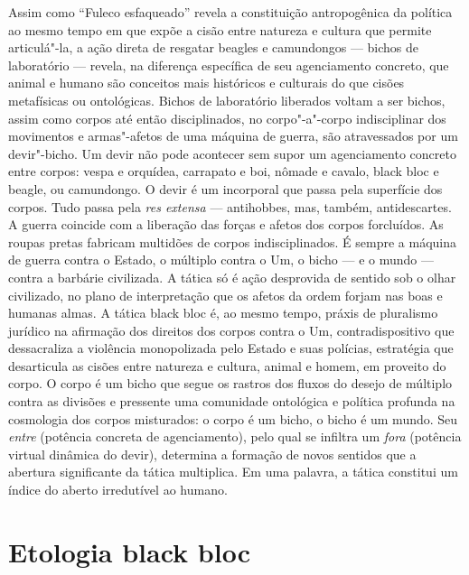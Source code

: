 Assim como ``Fuleco esfaqueado'' revela a constituição antropogênica da
política ao mesmo tempo em que expõe a cisão entre natureza e cultura
que permite articulá"-la, a ação direta de resgatar beagles e
camundongos --- bichos de laboratório --- revela, na diferença específica
de seu agenciamento concreto, que animal e humano são conceitos mais
históricos e culturais do que cisões metafísicas ou ontológicas. Bichos
de laboratório liberados voltam a ser bichos, assim como corpos até
então disciplinados, no corpo"-a"-corpo indisciplinar dos movimentos e
armas"-afetos de uma máquina de guerra, são atravessados por um
devir"-bicho. Um devir não pode acontecer sem supor um agenciamento
concreto entre corpos: vespa e orquídea, carrapato e boi, nômade e
cavalo, black bloc e beagle, ou camundongo. O devir é um
incorporal que passa pela superfície dos corpos. Tudo passa pela
\emph{res extensa} --- antihobbes, mas, também, antidescartes. A guerra
coincide com a liberação das forças e afetos dos corpos forcluídos. As
roupas pretas fabricam multidões de corpos indisciplinados. É sempre a
máquina de guerra contra o Estado, o múltiplo contra o Um, o bicho --- e
o mundo --- contra a barbárie civilizada. A tática só é ação desprovida
de sentido sob o olhar civilizado, no plano de interpretação que os
afetos da ordem forjam nas boas e humanas almas. A tática black bloc é,
ao mesmo tempo, práxis de pluralismo jurídico na afirmação dos direitos
dos corpos contra o Um, contradispositivo que dessacraliza a violência
monopolizada pelo Estado e suas polícias, estratégia que desarticula as
cisões entre natureza e cultura, animal e homem, em proveito do corpo. O
corpo é um bicho que segue os rastros dos fluxos do desejo de múltiplo
contra as divisões e pressente uma comunidade ontológica e política
profunda na cosmologia dos corpos misturados: o corpo é um bicho, o
bicho é um mundo. Seu \emph{entre }(potência concreta de
agenciamento), pelo qual se infiltra um \emph{fora }(potência
virtual dinâmica do devir), determina a formação de novos sentidos que a
abertura significante da tática multiplica. Em uma palavra, a tática
constitui um índice do aberto irredutível ao humano.

\chapter{Etologia black bloc}

